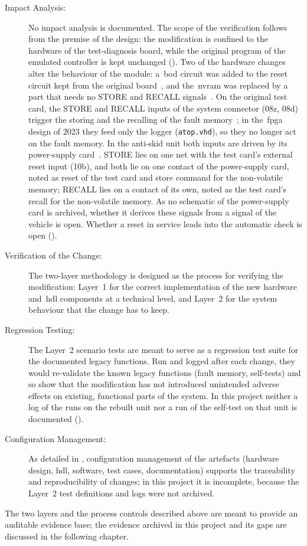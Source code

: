\begin{description}
	\item[Impact Analysis:] No impact analysis is documented. The scope of the verification follows from the premise of the design: the modification is confined to the hardware of the test-diagnosis board, while the original program of the emulated controller is kept unchanged (). Two of the hardware changes alter the behaviour of the module: a~\gls{bod} circuit was added to the reset circuit kept from the original board~\cite[Sec.~2]{leyer2023}, and the~\gls{nvram} was replaced by a part that needs no STORE and RECALL signals~\cite[Sec.~2.5]{leyer2023}. On the original test card, the STORE and RECALL inputs of the system connector (08z, 08d) trigger the storing and the recalling of the fault memory~\cite[Sec.~5.1.4]{dolata2023}; in the~\gls{fpga} design of 2023 they feed only the logger (\texttt{atop.vhd}), so they no longer act on the fault memory. In the anti-skid unit both inputs are driven by its power-supply card~\cite{backplane2010}. STORE lies on one net with the test card's external reset input (10b), and both lie on one contact of the power-supply card, noted as reset of the test card and store command for the non-volatile memory; RECALL lies on a contact of its own, noted as the test card's recall for the non-volatile memory. As no schematic of the power-supply card is archived, whether it derives these signals from a signal of the vehicle is open. Whether a reset in service leads into the automatic check is open ().
	\item[Verification of the Change:] The two-layer methodology is designed as the process for verifying the modification: Layer~1 for the correct implementation of the new hardware and~\gls{hdl} components at a technical level, and Layer~2 for the system behaviour that the change has to keep.
	\item[Regression Testing:] The Layer~2 scenario tests are meant to serve as a regression test suite for the documented legacy functions. Run and logged after each change, they would re-validate the known legacy functions (fault memory, self-tests) and so show that the modification has not introduced unintended adverse effects on existing, functional parts of the system. In this project neither a log of the runs on the rebuilt unit nor a run of the self-test on that unit is documented ().
	\item[Configuration Management:] As detailed in , configuration management of the artefacts (hardware design, \gls{hdl}, software, test cases, documentation) supports the traceability and reproducibility of changes; in this project it is incomplete, because the Layer~2 test definitions and logs were not archived.
\end{description}

The two layers and the process controls described above are meant to provide an auditable evidence base; the evidence archived in this project and its gaps are discussed in the following chapter.
